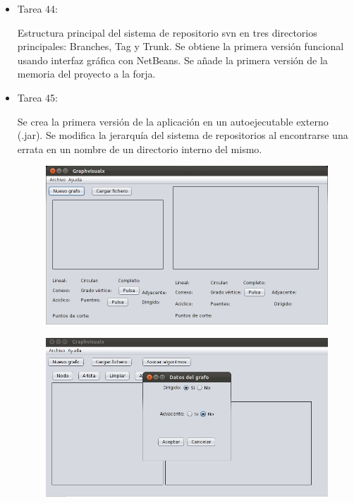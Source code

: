 \begin{itemize}
\item Tarea 44:

Estructura principal del sistema de repositorio svn en tres directorios principales: Branches, Tag y Trunk. Se obtiene la primera versión funcional usando interfaz gráfica con NetBeans. Se añade la primera versión de la memoria del proyecto a la forja. \\

\item Tarea 45:

Se crea la primera versión de la aplicación en un autoejecutable externo (.jar). Se modifica la jerarquía del sistema de repositorios al encontrarse una errata en un nombre de un directorio interno del mismo.
\begin{figure}[H]
\begin{center}
\includegraphics[width=15cm]{./imagenes_documentacion/Graphvisualx_5_11_2011/captura_1.jpeg}
\end{center}
\end{figure}
\newpage
\begin{figure}[H]
\begin{center}
\includegraphics[width=14cm]{./imagenes_documentacion/Graphvisualx_5_11_2011/captura_2.jpeg}

\end{center}
\end{figure}
\end{itemize}
